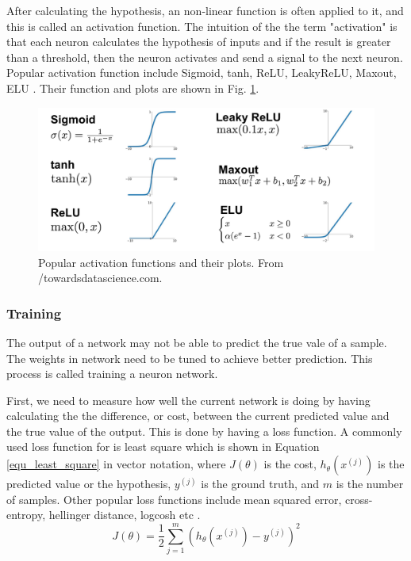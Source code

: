 After calculating the hypothesis, an non-linear function is often applied to it, and this is called an activation function. The intuition of the the term "activation" is that each neuron calculates the hypothesis of inputs and if the result is greater than a threshold, then the neuron activates and send a signal to the next neuron. Popular activation function include Sigmoid, tanh, ReLU, LeakyReLU, Maxout, ELU \cite{goodfellow2016deep}. Their function and plots are shown in Fig. \ref{fig_activation_func}.
\begin{figure}[h!]
\begin{center}
\includegraphics[width = 13cm]{img/activation_function.png}
\caption[Popular activation functions and their plots]{Popular activation functions and their plots. From /towardsdatascience.com. \label{fig_activation_func}}
\end{center}
\end{figure}

\subsubsection{Training}
The output of a network may not be able to predict the true vale of a sample. The weights in network need to be tuned to achieve better prediction. This process is called training a neuron network.

First, we need to measure how well the current network is doing by having calculating the the difference, or cost, between the current predicted value and the true value of the output. This is done by having a loss function. A commonly used loss function for is least square which is shown in Equation \ref{equ_least_square} in vector notation, where $J(\theta)$ is the cost, $h_\theta(x^{(j)})$ is the predicted value or the hypothesis, $y^{(j)}$ is the ground truth, and $m$ is the number of samples. Other popular loss functions include mean squared error, cross-entropy, hellinger distance, logcosh etc \cite{goodfellow2016deep}.
\begin{equation}
J(\theta)=\frac{1}{2}\sum^m_{j=1}(h_\theta(x^{(j)}) - y^{(j)})^2
 \label{equ_least_square}
\end{equation}

